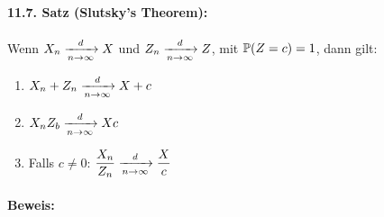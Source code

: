 \paragraph{11.7. Satz (Slutsky's Theorem):} Wenn $X_n\nto{d}{n\to\infty}X$ und $Z_n\nto{d}{n\to\infty}Z$, mit $\mathbb{P}(Z=c)=1$, dann gilt:
\begin{enumerate}[label=(\roman*)]
    \item $X_n+Z_n\nto{d}{n\to\infty}X+c$
    \item $X_nZ_b\nto{d}{n\to\infty}Xc$
    \item Falls $c\neq0$: $\displaystyle\frac{X_n}{Z_n}\nto{d}{n\to\infty}\frac{X}{c}$
\end{enumerate}

\paragraph{Beweis:}
